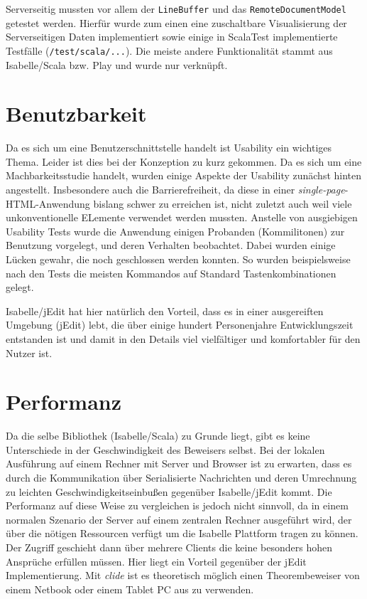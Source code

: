 Serverseitig mussten vor allem der \texttt{LineBuffer} und das \texttt{RemoteDocumentModel} getestet
werden. Hierfür wurde zum einen eine zuschaltbare Visualisierung der Serverseitigen Daten
implementiert sowie einige in ScalaTest implementierte Testfälle (\texttt{/test/scala/...}). Die
meiste andere Funktionalität stammt aus Isabelle/Scala bzw. Play und wurde nur verknüpft.

\section{Benutzbarkeit}
\label{sec:usability}

Da es sich um eine Benutzerschnittstelle handelt ist Usability ein wichtiges Thema. Leider ist dies
bei der Konzeption zu kurz gekommen. Da es sich um eine Machbarkeitsstudie handelt, wurden einige
Aspekte der Usability zunächst hinten angestellt. Insbesondere auch die Barrierefreiheit, da diese
in einer \textit{single-page}-HTML-Anwendung bislang schwer zu erreichen ist, nicht zuletzt auch
weil viele unkonventionelle ELemente verwendet werden mussten. Anstelle von ausgiebigen Usability
Tests wurde die Anwendung einigen Probanden (Kommilitonen) zur Benutzung vorgelegt, und deren
Verhalten beobachtet. Dabei wurden einige Lücken gewahr, die noch geschlossen werden konnten. So
wurden beispielsweise nach den Tests die meisten Kommandos auf Standard Tastenkombinationen gelegt.

Isabelle/jEdit hat hier natürlich den Vorteil, dass es in einer ausgereiften Umgebung (jEdit) lebt,
die über einige hundert Personenjahre Entwicklungszeit entstanden ist und damit in den Details viel
vielfältiger und komfortabler für den Nutzer ist.

\section{Performanz}

Da die selbe Bibliothek (Isabelle/Scala) zu Grunde liegt, gibt es keine Unterschiede in der
Geschwindigkeit des Beweisers selbst. Bei der lokalen Ausführung auf einem Rechner mit Server und
Browser ist zu erwarten, dass es durch die Kommunikation über Serialisierte Nachrichten und deren
Umrechnung zu leichten Geschwindigkeitseinbußen gegenüber Isabelle/jEdit kommt. Die Performanz auf
diese Weise zu vergleichen is jedoch nicht sinnvoll, da in einem normalen Szenario der Server auf
einem zentralen Rechner ausgeführt wird, der über die nötigen Ressourcen verfügt um die Isabelle
Plattform tragen zu können. Der Zugriff geschieht dann über mehrere Clients die keine besonders
hohen Ansprüche erfüllen müssen. Hier liegt ein Vorteil gegenüber der jEdit Implementierung.
Mit \textit{clide} ist es theoretisch möglich einen Theorembeweiser von einem Netbook oder einem
Tablet PC aus zu verwenden.

